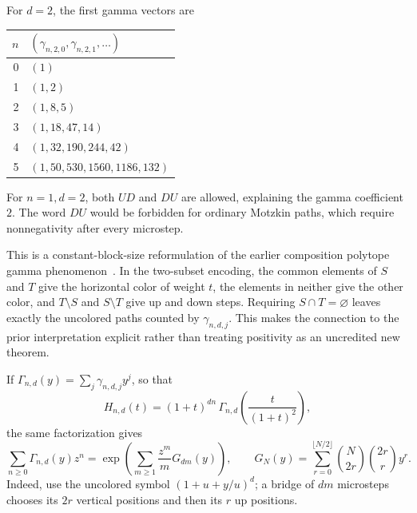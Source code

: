 \documentclass[11pt]{article}
\numberwithin{equation}{section}
\theoremstyle{definition}
\begin{document}
For $d=2$, the first gamma vectors are
\begin{center}
\begin{tabular}{r l}
\toprule
$n$ & $(\gamma_{n,2,0},\gamma_{n,2,1},\ldots)$\\
\midrule
0 & $(1)$\\
1 & $(1,2)$\\
2 & $(1,8,5)$\\
3 & $(1,18,47,14)$\\
4 & $(1,32,190,244,42)$\\
5 & $(1,50,530,1560,1186,132)$\\
\bottomrule
\end{tabular}
\end{center}
For $n=1,d=2$, both $UD$ and $DU$ are allowed, explaining the gamma
coefficient $2$. The word $DU$ would be forbidden for ordinary Motzkin paths,
which require nonnegativity after every microstep.

This is a constant-block-size reformulation of the earlier composition
polytope gamma phenomenon~\cite[Theorem~1.2 and Proposition~2.2]{A}.
In the two-subset encoding, the common elements of $S$ and $T$ give the
horizontal color of weight $t$, the elements in neither give the other color,
and $T\setminus S$ and $S\setminus T$ give up and down steps. Requiring
$S\cap T=\varnothing$ leaves exactly the uncolored paths counted by
$\gamma_{n,d,j}$. This makes the connection to the prior interpretation
explicit rather than treating positivity as an uncredited new theorem.

If $\Gamma_{n,d}(y)=\sum_j\gamma_{n,d,j}y^j$, so that
\begin{equation}
 H_{n,d}(t)=(1+t)^{dn}\,\Gamma_{n,d}\!\left(\frac{t}{(1+t)^2}\right),
 \label{eq:Hgamma}
\end{equation}
the same factorization gives
\begin{equation}
 \sum_{n\geq0}\Gamma_{n,d}(y)z^n
 =\exp\left(\sum_{m\geq1}\frac{z^m}{m}G_{dm}(y)\right),
 \qquad
 G_N(y)=\sum_{r=0}^{\lfloor N/2\rfloor}\binom{N}{2r}\binom{2r}{r}y^r .
 \label{eq:gammagf}
\end{equation}
Indeed, use the uncolored symbol $(1+u+y/u)^d$; a bridge of $dm$
microsteps chooses its $2r$ vertical positions and then its $r$ up positions.
\end{document}
